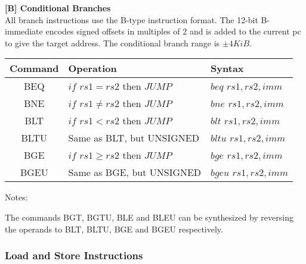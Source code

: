 	\textbf{ {\footnotesize[B] Conditional Branches }} \\
	
	All branch instructions use the B-type instruction format. The 12-bit B-immediate encodes signed offsets in multiples of 2 and is added to the current pc to give the target address. The conditional branch range is $\pm4KiB$.\\
	
	\begin{threeparttable}
	
		\begin{tabular}{|c|p{3in}|p{1in}|} \hline
		\setrow{\bfseries}Command &\setrow{\bfseries} Operation &\setrow{\bfseries} Syntax 					 \\\hline
		\cellcolor{blue} BEQ & {\small $if$ $rs1=rs2$ then $JUMP$} & {\small $beq$ $rs1,rs2,imm$} 		 \\\hline
		\cellcolor{blue} BNE & {\small $if$ $rs1\neq rs2$ then $JUMP$} & {\small $bne$ $rs1,rs2,imm$} 	 \\\hline
		\cellcolor{blue} BLT & {\small $if$ $rs1<rs2$ then $JUMP$} & {\small $blt$ $rs1,rs2,imm$}		 \\\hline 
		\cellcolor{blue} BLTU & {\small Same as BLT, but UNSIGNED } & {\small $bltu$ $rs1,rs2,imm$}		 \\\hline
		\cellcolor{blue} BGE  & {\small $if$ $rs1\geq rs2$ then $JUMP$} & {\small $bge$ $rs1,rs2,imm$} 	 \\\hline
		\cellcolor{blue} BGEU & {\small Same as BGE, but UNSIGNED } & {\footnotesize $bgeu$ $rs1,rs2,imm$}\\\hline
		\end{tabular}
		
		\begin{tablenotes}
			\footnotesize
			\item 
			Notes:
			\item 
			The commands BGT, BGTU, BLE and BLEU can be synthesized by reversing the operands to BLT, BLTU, BGE and BGEU respectively.
			\label{subsubsec:table2.5}
			\vspace{5mm}
		\end{tablenotes}
		
	\end{threeparttable}
	
	\subsubsection{Load and Store Instructions}
	\label{subsubsec:LoadsStores}		
	
